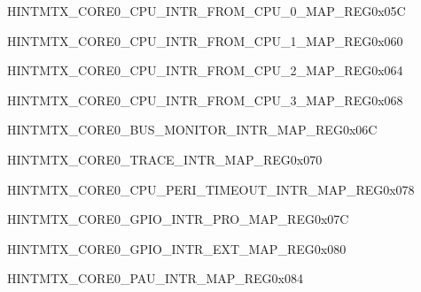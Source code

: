 \begin{register}{H}{INTMTX\_CORE0\_CPU\_INTR\_FROM\_CPU\_0\_MAP\_REG}{0x05C}\label{regdesc:INTMTXCORE0CPUINTRFROMCPU0MAPREG} \end{register}\vspace{-3em}
\begin{register}{H}{INTMTX\_CORE0\_CPU\_INTR\_FROM\_CPU\_1\_MAP\_REG}{0x060}\label{regdesc:INTMTXCORE0CPUINTRFROMCPU1MAPREG} \end{register}\vspace{-3em}
\begin{register}{H}{INTMTX\_CORE0\_CPU\_INTR\_FROM\_CPU\_2\_MAP\_REG}{0x064}\label{regdesc:INTMTXCORE0CPUINTRFROMCPU2MAPREG} \end{register}\vspace{-3em}
\begin{register}{H}{INTMTX\_CORE0\_CPU\_INTR\_FROM\_CPU\_3\_MAP\_REG}{0x068}\label{regdesc:INTMTXCORE0CPUINTRFROMCPU3MAPREG} \end{register}\vspace{-3em}
\begin{register}{H}{INTMTX\_CORE0\_BUS\_MONITOR\_INTR\_MAP\_REG}{0x06C}\label{regdesc:INTMTXCORE0BUSMONITORINTRMAPREG} \end{register}\vspace{-3em}
\begin{register}{H}{INTMTX\_CORE0\_TRACE\_INTR\_MAP\_REG}{0x070}\label{regdesc:INTMTXCORE0TRACEINTRMAPREG} \end{register}\vspace{-3em}
\begin{register}{H}{INTMTX\_CORE0\_CPU\_PERI\_TIMEOUT\_INTR\_MAP\_REG}{0x078}\label{regdesc:INTMTXCORE0CPUPERITIMEOUTINTRMAPREG} \end{register}\vspace{-3em}
\begin{register}{H}{INTMTX\_CORE0\_GPIO\_INTR\_PRO\_MAP\_REG}{0x07C}\label{regdesc:INTMTXCORE0GPIOINTRPROMAPREG} \end{register}\vspace{-3em}
\begin{register}{H}{INTMTX\_CORE0\_GPIO\_INTR\_EXT\_MAP\_REG}{0x080}\label{regdesc:INTMTXCORE0GPIOINTREXTMAPREG} \end{register}\vspace{-3em}
\begin{register}{H}{INTMTX\_CORE0\_PAU\_INTR\_MAP\_REG}{0x084}\label{regdesc:INTMTXCORE0PAUINTRMAPREG} \end{register}\vspace{-3em}
